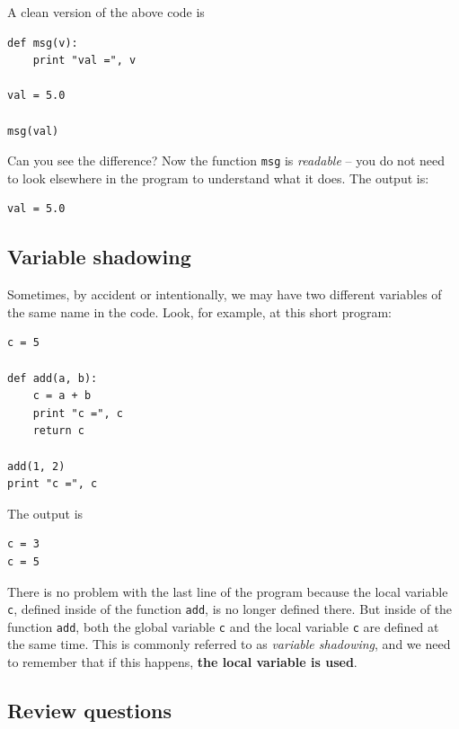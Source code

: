 \noindent
A clean version of the above code is

\begin{verbatim}
def msg(v):
    print "val =", v

val = 5.0

msg(val)
\end{verbatim}
Can you see the difference? Now the function {\tt msg} is {\em readable} -- you do not 
need to look elsewhere in the program to understand what it does. The output is:

\begin{verbatim}
val = 5.0
\end{verbatim}

\subsection{Variable shadowing}

Sometimes, by accident or intentionally, we may have two different 
variables of the same name in the code. Look, for example, at this short program:

\begin{verbatim}
c = 5

def add(a, b):
    c = a + b
    print "c =", c
    return c

add(1, 2)
print "c =", c
\end{verbatim}
The output is

\begin{verbatim}
c = 3
c = 5
\end{verbatim}
There is no 
problem with the last line of the program because the local variable {\tt c}, defined
inside of the function {\tt add}, is no longer defined there. But inside of the function
{\tt add}, both the global variable {\tt c} and the local variable {\tt c} are defined at 
the same time. This is commonly referred to as {\em variable shadowing}, and we need to 
remember that if this happens, {\bf the local variable is used}.

\subsection{Review questions}

